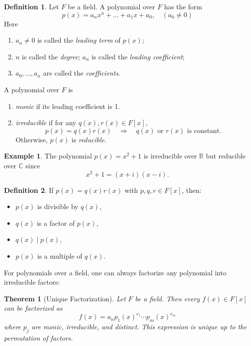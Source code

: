 \documentclass[11pt,openany]{book}
\theoremstyle{plain}
\newtheorem{theorem}{Theorem}[chapter]
\theoremstyle{definition}
\newtheorem{definition}[definition]{Definition}
\newtheorem{example}[example]{Example}
\theoremstyle{remark}
\begin{document}
\begin{definition}  
Let $F$ be a field. A polynomial over $F$ has the form
    \[
        p(x) = a_n x^n + \dots + a_1 x + a_0, \quad (a_0 \neq 0)
    \]
    Here
    \begin{enumerate}
    \item $a_n \neq 0$ is called the \textit{leading term} of $p(x)$; 
    \item $n$ is called the \textit{degree}; $a_n$ is called the \textit{leading coefficient}; 
    \item $a_0, \dots, a_n$ are called the \textit{coefficients}.
\end{enumerate}
    A polynomial over $F$ is 
\begin{enumerate}
    \item \textit{monic} if its leading coefficient is 1.

    \item \textit{irreducible} if for any $q(x), r(x) \in F[x]$,
    \[
        p(x) = q(x)r(x) \quad \Rightarrow \quad q(x) \text{ or } r(x) \text{ is constant}.
    \]
    Otherwise, $p(x)$ is \textit{reducible}.
\end{enumerate}
\end{definition}

\begin{example}  
The polynomial $p(x) = x^2 + 1$ is irreducible over $\mathbb{R}$ but reducible over $\mathbb{C}$ since
\[
    x^2 + 1 = (x+i)(x-i).
\]
\end{example}

\begin{definition}  
If $p(x) = q(x)r(x)$ with $p,q,r \in F[x]$, then:
\begin{itemize}
    \item $p(x)$ is divisible by $q(x)$,
    \item $q(x)$ is a factor of $p(x)$,
    \item $q(x) \mid p(x)$,
    \item $p(x)$ is a multiple of $q(x)$.
\end{itemize}
\end{definition}

For polynomials over a field, one can always factorize any polynomial into irreducible factors:
\begin{theorem} [Unique Factorization] 
Let $F$ be a field. Then every $f(x) \in F[x]$ can be factorized as
\[
    f(x) = a_n p_1(x)^{r_1} \cdots p_m(x)^{r_m}
\]
where $p_j$ are monic, irreducible, and distinct. This expression is unique up to the permutation of factors.
\end{theorem}
\end{document}
